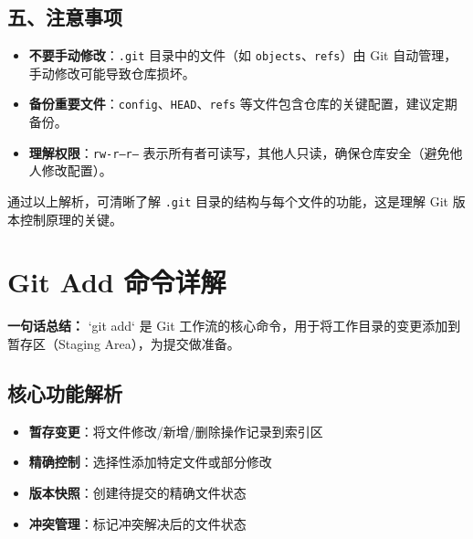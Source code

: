 \subsection{五、注意事项}
\begin{itemize}[leftmargin=*, nosep]
    \item \textbf{不要手动修改}：\texttt{.git} 目录中的文件（如 \texttt{objects}、\texttt{refs}）由 Git 自动管理，手动修改可能导致仓库损坏。
    \item \textbf{备份重要文件}：\texttt{config}、\texttt{HEAD}、\texttt{refs} 等文件包含仓库的关键配置，建议定期备份。
    \item \textbf{理解权限}：\texttt{rw-r--r--} 表示所有者可读写，其他人只读，确保仓库安全（避免他人修改配置）。
\end{itemize}


通过以上解析，可清晰了解 \texttt{.git} 目录的结构与每个文件的功能，这是理解 Git 版本控制原理的关键。


\section{Git Add 命令详解}
\textbf{一句话总结：}  
`git add` 是 Git 工作流的核心命令，用于将工作目录的变更添加到暂存区（Staging Area），为提交做准备。

\subsection{核心功能解析}
\begin{itemize}[leftmargin=*, nosep]
    \item \textbf{暂存变更}：将文件修改/新增/删除操作记录到索引区
    \item \textbf{精确控制}：选择性添加特定文件或部分修改
    \item \textbf{版本快照}：创建待提交的精确文件状态
    \item \textbf{冲突管理}：标记冲突解决后的文件状态
\end{itemize}

